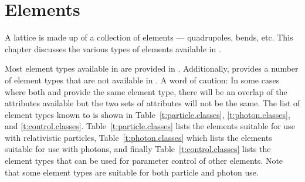 \chapter{Elements}
\label{c:elements}

A lattice is made up of a collection of elements --- quadrupoles,
bends, etc. This chapter discusses the various types of elements
available in \bmad.

Most element types available in \mad are provided in \bmad.
Additionally, \bmad provides a number of element types that are not
available in \mad.  A word of caution: In some cases where both \mad
and \bmad provide the same element type, there will be an overlap of
the attributes available but the two sets of attributes will not be
the same.  The list of element types known to \bmad is shown in
Table~\ref{t:particle.classes}, \ref{t:photon.classes}, and
\ref{t:control.classes}.  Table~\ref{t:particle.classes} lists the
elements suitable for use with relativistic particles,
Table~\ref{t:photon.classes} which lists the elements suitable for use
with photons, and finally Table~\ref{t:control.classes} lists the
 element types that can be used for parameter control
of other elements. Note that some element types are suitable for both
particle and photon use.

